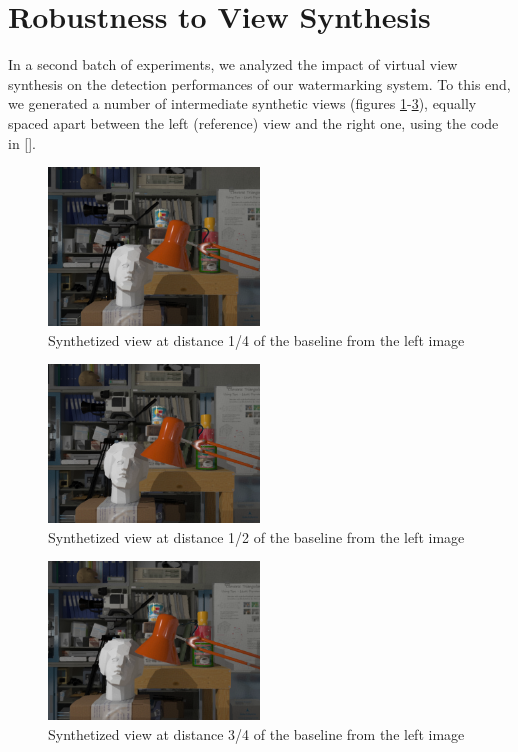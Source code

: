 \section{Robustness to View Synthesis}

In a second batch of experiments, we analyzed the impact of virtual view synthesis on the detection performances of our watermarking system. To this end, we generated a number of intermediate synthetic views (figures \ref{fig:synt1/4}-\ref{fig:synt3/4}), equally spaced apart between the left (reference) view and the right one, using the code in [].\newline

\begin{figure}[h!]
\centering
\includegraphics[width=0.5\textwidth]{./img/synth_view1_25.png}
\caption{\small{Synthetized view at distance 1/4 of the baseline from the left image }}
\label{fig:synt1/4}
\end{figure}
\begin{figure}[h!]
\centering
\includegraphics[width=0.5\textwidth]{./img/synth_view1_50.png}
\caption{\small{Synthetized view at distance 1/2 of the baseline from the left image }}
\label{fig:synt1/2}
\end{figure}
\begin{figure}[h!]
\centering
\includegraphics[width=0.5\textwidth]{./img/synth_view1_75.png}
\caption{\small{Synthetized view at distance 3/4 of the baseline from the left image }}
\label{fig:synt3/4}
\end{figure}

